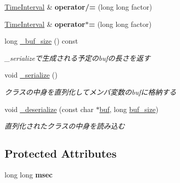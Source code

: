 \begin{DoxyCompactItemize}
\hyperlink{classskl_1_1_time_interval}{Time\+Interval} \& {\bfseries operator/=} (long long factor)
\item 
\hypertarget{classskl_1_1_time_interval_aa627ad5802fd80fb78af4c98d6b6a867}{}\label{classskl_1_1_time_interval_aa627ad5802fd80fb78af4c98d6b6a867} 
\hyperlink{classskl_1_1_time_interval}{Time\+Interval} \& {\bfseries operator$\ast$=} (long long factor)
\item 
\hypertarget{classskl_1_1_time_interval_ace5e1abd3590b0663a2d40ac6f4a0ff7}{}\label{classskl_1_1_time_interval_ace5e1abd3590b0663a2d40ac6f4a0ff7} 
long \hyperlink{classskl_1_1_time_interval_ace5e1abd3590b0663a2d40ac6f4a0ff7}{\+\_\+buf\+\_\+size} () const
\begin{DoxyCompactList}\small\item\em \+\_\+serializeで生成される予定のbufの長さを返す \end{DoxyCompactList}\item 
\hypertarget{classskl_1_1_time_interval_ae2a439599345ef0c813c2a37278bc50d}{}\label{classskl_1_1_time_interval_ae2a439599345ef0c813c2a37278bc50d} 
void \hyperlink{classskl_1_1_time_interval_ae2a439599345ef0c813c2a37278bc50d}{\+\_\+serialize} ()
\begin{DoxyCompactList}\small\item\em クラスの中身を直列化してメンバ変数のbufに格納する \end{DoxyCompactList}\item 
\hypertarget{classskl_1_1_time_interval_aabf6e35b9f1fe546f8b884cd7dc732fc}{}\label{classskl_1_1_time_interval_aabf6e35b9f1fe546f8b884cd7dc732fc} 
void \hyperlink{classskl_1_1_time_interval_aabf6e35b9f1fe546f8b884cd7dc732fc}{\+\_\+deserialize} (const char $\ast$\hyperlink{classskl_1_1_serializable_a1d203d9f0049ce37183a0dcefbc6399a}{buf}, long \hyperlink{classskl_1_1_serializable_a087eb19fada917a42b8411bfecbac0f1}{buf\+\_\+size})
\begin{DoxyCompactList}\small\item\em 直列化されたクラスの中身を読み込む \end{DoxyCompactList}\end{DoxyCompactItemize}
\subsection*{Protected Attributes}
\begin{DoxyCompactItemize}
\item 
\hypertarget{classskl_1_1_time_interval_a7992e2eaeba03bc07d341734d47f99d0}{}\label{classskl_1_1_time_interval_a7992e2eaeba03bc07d341734d47f99d0} 
long long {\bfseries msec}
\end{DoxyCompactItemize}
